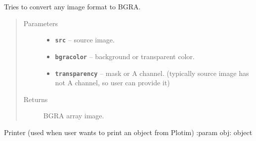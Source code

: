 \documentclass[letterpaper,10pt,english]{sphinxmanual}
\begin{document}

\begin{fulllineitems}
\label{RRtoolbox.lib:RRtoolbox.lib.plotter.convert2bgra}
Tries to convert any image format to BGRA.
\begin{quote}\begin{description}
\item[{Parameters}] \leavevmode\begin{itemize}
\item {} 
\textbf{\texttt{src}} -- source image.

\item {} 
\textbf{\texttt{bgracolor}} -- background or transparent color.

\item {} 
\textbf{\texttt{transparency}} -- mask or A channel.
(typically source image has not A channel, so user can provide it)

\end{itemize}

\item[{Returns}] \leavevmode
BGRA array image.

\end{description}\end{quote}

\end{fulllineitems}


\begin{fulllineitems}
\label{RRtoolbox.lib:RRtoolbox.lib.plotter.echo}
Printer (used when user wants to print an object from Plotim)
:param obj: object

\end{fulllineitems}

\end{document}
